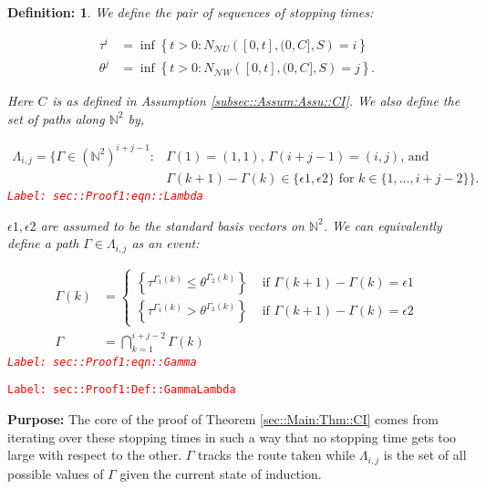 \documentclass[12pt]{article}
\newcommand{\mb}{\mathbb}
\newcommand{\mc}{\mathcal}
\newcommand{\te}{\text}
\newcommand{\ep}{\epsilon}
\newcommand{\tr}{\textcolor{red}}
\newcommand{\labe}[1]{\tr{\texttt{Label: #1}}}
\newcommand{\purpose}{\textbf{Purpose: }}
\newcommand{\neigh}{\mc{N}}					%
\renewcommand{\U}{U}							%
\newcommand{\UU}{W}								%
\renewcommand{\S}{S}							%
\newcommand{\ev}{\ep}							%
\renewcommand{\t}{t}							%
\newcommand{\poiss}[1]{N_{#1}}						%
\newcommand{\rt}[1]{\tau^{#1}}						%
\newcommand{\rtt}[1]{\theta^{#1}}					%
\renewcommand{\it}{k}								%
\newcommand{\itt}{i}								%
\newcommand{\ittt}{j}								%
\newcommand{\const}[1]{C_{#1}}						%
\newcommand{\apath}{\Gamma}						%
\newcommand{\pathset}[2]{\Lambda_{#1,#2}}			%
\newtheorem{defn}[thms]{Definition: }
\begin{document}
\begin{defn}
We define the pair of sequences of stopping times:

\begin{align*}
\rt{\itt} &= \inf \left\{\t > 0: \poiss{\neigh{\U}}\left([0,\t],(0,\const{}],\S\right) = \itt\right\}\\
\rtt{\ittt} &= \inf \left\{\t > 0: \poiss{\neigh{\UU}}\left([0,\t],(0,\const{}],\S\right) = \ittt\right\}.
\end{align*}

Here \(\const{}\) is as defined in Assumption \ref{subsec::Assum:Assu::CI}. We also define the set of paths along \(\mb{N}^2\) by,

\begin{align}
\pathset{\itt}{\ittt} = \{\apath \in (\mb{N}^2)^{\itt+\ittt-1}: &\apath(1) = (1,1)\te{, } \apath(\itt+\ittt-1) = (\itt,\ittt)\te{, and } \nonumber\\
&\Gamma(\it+1) - \Gamma(\it)\in \{\ev{1},\ev{2}\}\te{ for }\it\in \{1,\dots, \itt+\ittt-2\}\}.
\label{sec::Proof1:eqn::Lambda}
\end{align}
\labe{sec::Proof1:eqn::Lambda}

\(\ev{1},\ev{2}\) are assumed to be the standard basis vectors on \(\mb{N}^2\). We can equivalently define a path \(\apath \in \pathset{\itt}{\ittt}\) as an event:

\begin{align}
\apath(\it) &= \begin{cases}
\left\{\rt{\apath_1(\it)} \leq \rtt{\apath_2(\it)}\right\} &\te{ if } \apath(\it+1) - \apath(\it) = \ev{1}\\
\left\{\rt{\apath_1(\it)} > \rtt{\apath_2(\it)}\right\} &\te{ if } \apath(\it+1) - \apath(\it) = \ev{2}
\end{cases}\\
\apath &= \bigcap_{\it=1}^{\itt+\ittt-2} \apath(\it)
\label{sec::Proof1:eqn::Gamma}
\end{align}
\labe{sec::Proof1:eqn::Gamma}
\label{sec::Proof1:Def::GammaLambda}
\end{defn}
\labe{sec::Proof1:Def::GammaLambda}

\purpose The core of the proof of Theorem \ref{sec::Main:Thm::CI} comes from iterating over these stopping times in such a way that no stopping time gets too large with respect to the other. \(\apath\) tracks the route taken while \(\pathset{\itt}{\ittt}\) is the set of all possible values of \(\apath\) given the current state of induction.
\end{document}
